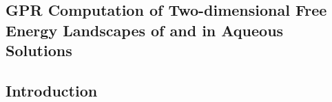\begin{spacing}{2.0}
    \chapter{GPR Computation of Two-dimensional Free Energy Landscapes of  and  in Aqueous Solutions}

    \section{Introduction}

    \lipsum[1]
\end{spacing}
